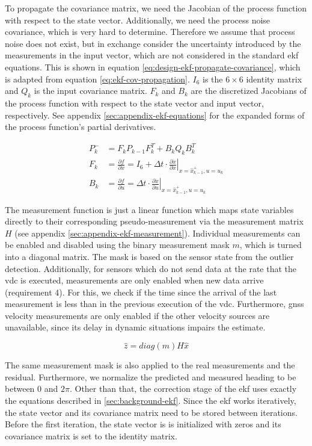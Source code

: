 To propagate the covariance matrix, we need the Jacobian of the process function with respect to the state vector. Additionally, we need the process noise covariance, which is very hard to determine. Therefore we assume that process noise does not exist, but in exchange consider the uncertainty introduced by the measurements in the input vector, which are not considered in the standard \gls{ekf} equations. This is shown in equation \ref{eq:design-ekf-propagate-covariance}, which is adapted from equation \ref{eq:ekf-cov-propagation}. $I_6$ is the $6 \times 6$ identity matrix and $Q_k$ is the input covariance matrix. $F_k$ and $B_k$ are the discretized Jacobians of the process function with respect to the state vector and input vector, respectively. See appendix \ref{sec:appendix-ekf-equations} for the expanded forms of the process function's partial derivatives.

\begin{subequations}\label{eq:design-ekf-propagate-covariance}
\begin{alignat}{2}%
P_k^- &= F_k P_{k-1} F_k^T + B_k Q_k B_k^T \\%
F_k &= \frac{\partial f}{\partial x} = I_6 + \Delta t \cdot \left. \frac{\partial \dot{x}}{\partial x} \right|_{x = \hat{x}_{k-1}^+, u=u_k} \\%
B_k &= \frac{\partial f}{\partial u} = \Delta t \cdot \left. \frac{\partial \dot{x}}{\partial u} \right|_{x = \hat{x}_{k-1}^+, u=u_k}
\end{alignat}
\end{subequations}


The measurement function is just a linear function which maps state variables directly to their corresponding pseudo-measurement via the measurement matrix $H$ (see appendix \ref{sec:appendix-ekf-measurement}). Individual measurements can be enabled and disabled using the binary measurement mask $m$, which is turned into a diagonal matrix. The mask is based on the sensor state from the outlier detection. Additionally, for sensors which do not send data at the rate that the \gls{vdc} is executed, measurements are only enabled when new data arrive (requirement 4). For this, we check if the time since the arrival of the last measurement is less than in the previous execution of the \gls{vdc}. Furthermore, \gls{gnss} velocity measurements are only enabled if the other velocity sources are unavailable, since its delay in dynamic situations impairs the estimate.

\begin{equation}
\hat{z} = \textit{diag}(m) H \hat{x}
\end{equation}

The same measurement mask is also applied to the real measurements and the residual. Furthermore, we normalize the predicted and measured heading to be between $0$ and $2\pi$. Other than that, the correction stage of the \gls{ekf} uses exactly the equations described in \ref{sec:background-ekf}. Since the \gls{ekf} works iteratively, the state vector and its covariance matrix need to be stored between iterations. Before the first iteration, the state vector is is initialized with zeros and its covariance matrix is set to the identity matrix.
